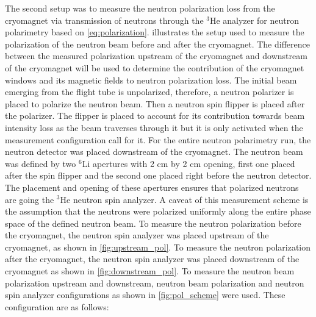 The second setup was to measure the neutron polarization loss from the cryomagnet via transmission of neutrons through the $^3$He analyzer for neutron polarimetry based on \cref{eq:polarization}.  illustrates the setup used to measure the polarization of the neutron beam before and after the cryomagnet. The difference between the measured polarization upstream of the cryomagnet and downstream of the cryomagnet will be used to determine the contribution of the cryomagnet windows and its magnetic fields to neutron polarization loss. The initial beam emerging from the flight tube is unpolarized, therefore, a neutron polarizer is placed to polarize the neutron beam. Then a neutron spin flipper is placed after the polarizer. The flipper is placed to account for its contribution towards beam intensity loss as the beam traverses through it but it is only activated when the measurement configuration call for it. For the entire neutron polarimetry run, the neutron detector was placed downstream of the cryomagnet. The neutron beam was defined by two $^6$Li apertures with 2 cm by 2 cm opening, first one placed after the spin flipper and the second one placed right before the neutron detector. The placement and opening of these apertures ensures that polarized neutrons are going the $^3$He neutron spin analyzer. A caveat of this measurement scheme is the assumption that the neutrons were polarized uniformly along the entire phase space of the defined neutron beam. To measure the neutron polarization before the cryomagnet, the neutron spin analyzer was placed upstream of the cryomagnet, as shown in \cref{fig:upstream_pol}. To measure the  neutron polarization after the cryomagnet, the neutron spin analyzer was placed downstream of the cryomagnet as shown in \cref{fig:downstream_pol}. To measure the neutron beam polarization upstream and downstream, neutron beam polarization and neutron spin analyzer configurations as shown in \cref{fig:pol_scheme} were used. These configuration are as follows:
